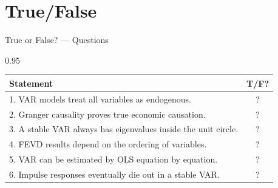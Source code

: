 \documentclass[9pt, aspectratio=169, t]{beamer}
\begin{document}
\section{True/False}

\begin{frame}{True or False? --- Questions}
    \begin{cminipage}{0.95\textwidth}
    \footnotesize
    \begin{center}
    \begin{tabular}{p{9cm}c}
        \toprule
        \textbf{Statement} & \textbf{T/F?} \\
        \midrule
        1. VAR models treat all variables as endogenous. & ? \\[0.15cm]
        2. Granger causality proves true economic causation. & ? \\[0.15cm]
        3. A stable VAR always has eigenvalues inside the unit circle. & ? \\[0.15cm]
        4. FEVD results depend on the ordering of variables. & ? \\[0.15cm]
        5. VAR can be estimated by OLS equation by equation. & ? \\[0.15cm]
        6. Impulse responses eventually die out in a stable VAR. & ? \\
        \bottomrule
    \end{tabular}
    \end{center}
    \end{cminipage}
\end{frame}
\end{document}
